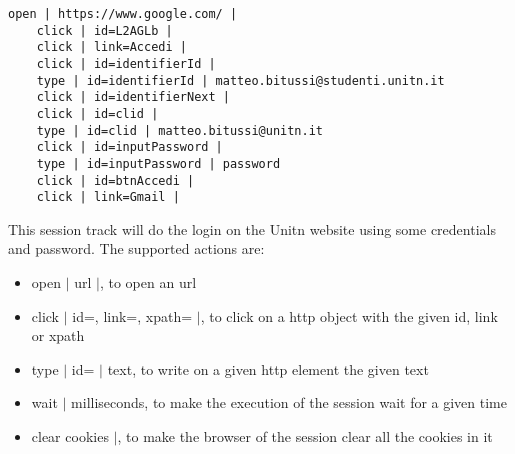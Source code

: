 \begin{lstlisting}[caption=Session track Unitn login]
    open | https://www.google.com/ |
    click | id=L2AGLb |
    click | link=Accedi |
    click | id=identifierId |
    type | id=identifierId | matteo.bitussi@studenti.unitn.it
    click | id=identifierNext |
    click | id=clid |
    type | id=clid | matteo.bitussi@unitn.it
    click | id=inputPassword |
    type | id=inputPassword | password
    click | id=btnAccedi |
    click | link=Gmail |
\end{lstlisting}

This \gls{session track} will do the login on the Unitn website using some credentials and password. The supported actions are:
\begin{itemize}
    \item open $|$ url $|$, to open an url
    \item click $|$ id=, link=, xpath= $|$, to click on a http object with the given id, link or xpath
    \item type $|$ id= $|$ text, to write on a given http element the given text
    \item wait $|$ milliseconds, to make the execution of the session wait for a given time 
    \item clear cookies $|$, to make the browser of the session clear all the cookies in it
\end{itemize}


 
